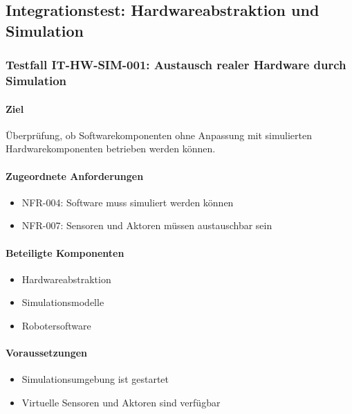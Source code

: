 \documentclass[
  a4paper,
  12pt,
  DIV=12,        %
  parskip=half,  %
  headings=small %
]{scrartcl}
\theoremstyle{definition}
\providecommand{\tightlist}{%
  \setlength{\itemsep}{0pt}\setlength{\parskip}{0pt}}
\theoremstyle{definition}
\begin{document}
\subsection{Integrationstest: Hardwareabstraktion und
Simulation}\label{integrationstest-hardwareabstraktion-und-simulation}

\subsubsection{Testfall IT-HW-SIM-001: Austausch realer Hardware durch
Simulation}\label{testfall-it-hw-sim-001-austausch-realer-hardware-durch-simulation}

\paragraph{Ziel}\label{ziel-15}

Überprüfung, ob Softwarekomponenten ohne Anpassung mit simulierten
Hardwarekomponenten betrieben werden können.

\paragraph{Zugeordnete
Anforderungen}\label{zugeordnete-anforderungen-15}

\begin{itemize}
\tightlist
\item
  NFR-004: Software muss simuliert werden können
\item
  NFR-007: Sensoren und Aktoren müssen austauschbar sein
\end{itemize}

\paragraph{Beteiligte Komponenten}\label{beteiligte-komponenten-6}

\begin{itemize}
\tightlist
\item
  Hardwareabstraktion
\item
  Simulationsmodelle
\item
  Robotersoftware
\end{itemize}

\paragraph{Voraussetzungen}\label{voraussetzungen-15}

\begin{itemize}
\tightlist
\item
  Simulationsumgebung ist gestartet
\item
  Virtuelle Sensoren und Aktoren sind verfügbar
\end{itemize}
\end{document}
